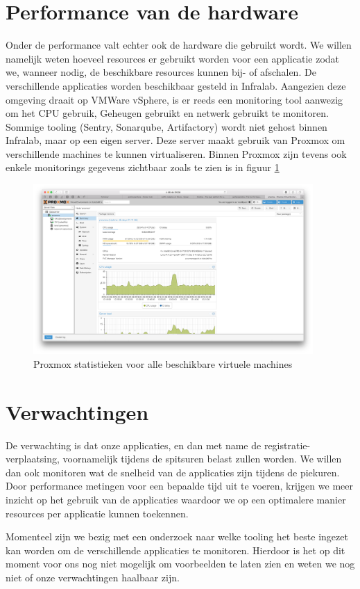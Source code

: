 \section{Performance van de hardware}
Onder de performance valt echter ook de hardware die gebruikt wordt. We willen namelijk weten hoeveel resources er gebruikt worden voor een applicatie zodat we, wanneer nodig, de beschikbare resources kunnen bij- of afschalen.
De verschillende applicaties worden beschikbaar gesteld in Infralab. Aangezien deze omgeving draait op VMWare vSphere, is er reeds een monitoring tool aanwezig om het CPU gebruik, Geheugen gebruikt en netwerk gebruikt te monitoren.
\newline
Sommige tooling (Sentry, Sonarqube, Artifactory) wordt niet gehost binnen Infralab, maar op een eigen server. Deze server maakt gebruik van Proxmox om verschillende machines te kunnen virtualiseren. Binnen Proxmox zijn tevens ook enkele monitorings gegevens zichtbaar zoals te zien is in figuur \ref{fig:proxmox}

\begin{figure}[H]
	\centering
	\includegraphics[width=0.95\textwidth]{img/proxmox.png}
	\caption{Proxmox statistieken voor alle beschikbare virtuele machines}
	\label{fig:proxmox}
\end{figure}

\section{Verwachtingen}
De verwachting is dat onze applicaties, en dan met name de registratie-verplaatsing, voornamelijk tijdens de spitsuren belast zullen worden. We willen dan ook monitoren wat de snelheid van de applicaties zijn tijdens de piekuren. Door performance metingen voor een bepaalde tijd uit te voeren, krijgen we meer inzicht op het gebruik van de applicaties waardoor we op een optimalere manier resources per applicatie kunnen toekennen. 

Momenteel zijn we bezig met een onderzoek naar welke tooling het beste ingezet kan worden om de verschillende applicaties te monitoren. Hierdoor is het op dit moment voor ons nog niet mogelijk om voorbeelden te laten zien en weten we nog niet of onze verwachtingen haalbaar zijn.
